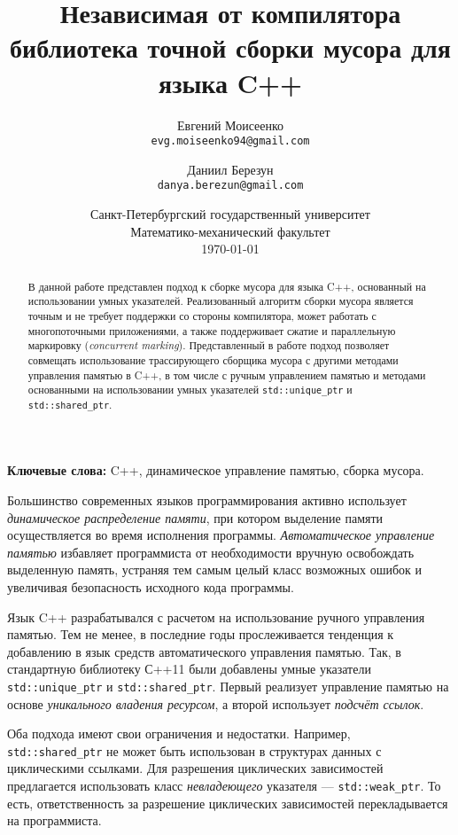 \documentclass[10pt]{article}
\title{Независимая от компилятора библиотека точной сборки мусора для языка C++}
\author{
        Евгений Моисеенко\\ \texttt{evg.moiseenko94@gmail.com}
            \and
        Даниил Березун\\ \texttt{danya.berezun@gmail.com}
}
\date{
  Санкт-Петербургский государственный университет\\
  Математико-механический факультет\\
  \today
}
\newcommand{\code}{\texttt}
\begin{document}
\maketitle

\begin{abstract}
В данной работе представлен подход к сборке мусора для языка C++, основанный на использовании умных указателей.
Реализованный алгоритм сборки мусора является точным и не требует поддержки со стороны компилятора,
может работать с многопоточными приложениями,
а также поддерживает сжатие и параллельную маркировку (\emph{concurrent marking}).
Представленный в работе подход позволяет совмещать использование 
трассирующего сборщика мусора с другими методами управления памятью в C++, 
в том числе с ручным управлением памятью и методами основанными на использовании
умных указателей \code{std::unique\_ptr} и \code{std::shared\_ptr}. 

\end{abstract}

\textbf{Ключевые слова:} C++, динамическое управление памятью, сборка мусора.

\vspace{5mm}

Большинство современных языков программирования активно использует \emph{динамическое распределение памяти}, 
при котором выделение памяти осуществляется во время исполнения программы. 
\emph{Автоматическое управление памятью} избавляет программиста от необходимости 
вручную освобождать выделенную память, 
устраняя тем самым целый класс возможных ошибок и 
увеличивая безопасность исходного кода программы. 


Язык C++ разрабатывался с расчетом на использование ручного управления памятью\cite{ellis1990annotated}.
Тем не менее, в последние годы прослеживается тенденция к добавлению в язык 
средств автоматического управления памятью. 
Так, в стандартную библиотеку С++11 были добавлены 
умные указатели \code{std::unique\_ptr} и \code{std::shared\_ptr}\cite{Stand}. 
Первый реализует управление памятью на основе \emph{уникального владения ресурсом},
а второй использует \emph{подсчёт ссылок}\cite{Jon11, Jon96}. 

Оба подхода имеют свои ограничения и недостатки. 
Например, \\\code{std::shared\_ptr} не может быть использован 
в структурах данных с циклическими ссылками.
Для разрешения циклических зависимостей предлагается использовать  
класс \emph{невладеющего} указателя --- \code{std::weak\_ptr}.
То есть, ответственность за разрешение циклических зависимостей 
перекладывается на программиста. 
\end{document}
